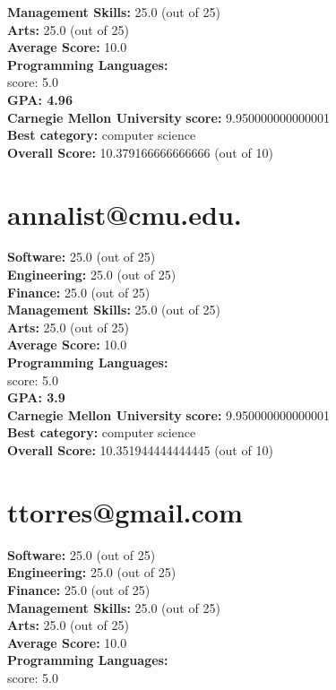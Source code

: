 \documentclass{article}
\begin{document}
    \textbf{Management Skills:} 25.0 (out of 25)\\
    \textbf{Arts:} 25.0 (out of 25)\\
\textbf{Average Score: } 10.0\\
\textbf{Programming Languages:} \\
score: 5.0\\
\textbf{GPA: 4.96}\\
\textbf{Carnegie Mellon University} \textbf{score:} 9.950000000000001\\
\textbf{Best category: } computer science\\
    \textbf{Overall Score: }10.379166666666666 (out of 10)\section{annalist@cmu.edu.}
\textbf{Software:} 25.0 (out of 25)\\
    \textbf{Engineering: } 25.0 (out of 25)\\
    \textbf{Finance:} 25.0 (out of 25)\\
    \textbf{Management Skills:} 25.0 (out of 25)\\
    \textbf{Arts:} 25.0 (out of 25)\\
\textbf{Average Score: } 10.0\\
\textbf{Programming Languages:} \\
score: 5.0\\
\textbf{GPA: 3.9}\\
\textbf{Carnegie Mellon University} \textbf{score:} 9.950000000000001\\
\textbf{Best category: } computer science\\
    \textbf{Overall Score: }10.351944444444445 (out of 10)\section{ttorres@gmail.com}
\textbf{Software:} 25.0 (out of 25)\\
    \textbf{Engineering: } 25.0 (out of 25)\\
    \textbf{Finance:} 25.0 (out of 25)\\
    \textbf{Management Skills:} 25.0 (out of 25)\\
    \textbf{Arts:} 25.0 (out of 25)\\
\textbf{Average Score: } 10.0\\
\textbf{Programming Languages:} \\
score: 5.0\\
\end{document}

